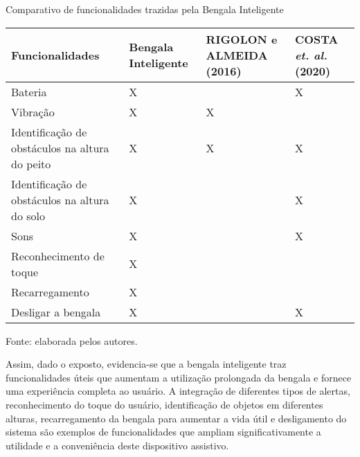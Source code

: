         \begin{quadro}[!ht]    
            \captionsetup{width=1.0\textwidth} %
            \caption{Comparativo de funcionalidades trazidas pela Bengala Inteligente}    
            \begin{tabular}{p{}p{}p{}p{}} %

                \toprule
                Funcionalidades & Bengala Inteligente & RIGOLON e ALMEIDA (2016) & COSTA \textit{et. al.} (2020)  \\
                \midrule
                Bateria                                                 & X  &    & X  \\
                Vibração                                                & X  &  X &    \\
                Identificação de obstáculos na altura do peito          & X  &  X & X  \\
                Identificação de obstáculos na altura do solo           & X  &    & X  \\
                Sons                                                    & X  &    & X  \\
                Reconhecimento de toque                                 & X  &    &    \\
                Recarregamento                                          & X  &    &    \\
                Desligar a bengala                                      & X  &    & X  \\
                \bottomrule
            \end{tabular}
            \caption*{Fonte: elaborada pelos autores.} %
            \label{tab:comparativo_funcionalidades}

        \end{quadro}
    Assim, dado o exposto, evidencia-se que a bengala inteligente traz funcionalidades úteis que aumentam a utilização prolongada da bengala e fornece uma experiência completa ao usuário. A integração de diferentes tipos de alertas, reconhecimento do toque do usuário, identificação de objetos em diferentes alturas, recarregamento da bengala para aumentar a vida útil e desligamento do sistema são exemplos de funcionalidades que ampliam significativamente a utilidade e a conveniência deste dispositivo assistivo.

    

